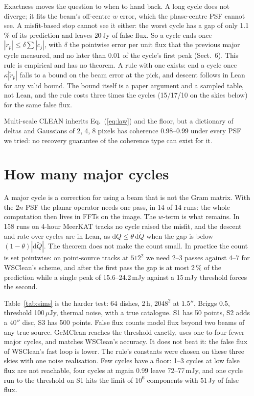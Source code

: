 \documentclass[twocolumn,10pt]{article}
\theoremstyle{remark}
\begin{document}
Exactness moves the question to when to hand back. A long cycle does not diverge; it fits the beam's off-centre $w$ error, which the phase-centre PSF cannot see. A misfit-based stop cannot see it either: the worst cycle has a gap of only 1.1\,\% of its prediction and leaves 20\,Jy of false flux. So a cycle ends once $|r_p|\le\delta\sum|c_j|$, with $\delta$ the pointwise error per unit flux that the previous major cycle measured, and no later than $0.01$ of the cycle's first peak (Sect.~6). This rule is empirical and has no theorem. A rule with one exists: end a cycle once $\kappa|\tilde r_p|$ falls to a bound on the beam error at the pick, and descent follows in Lean for any valid bound. The bound itself is a paper argument and a sampled table, not Lean, and the rule costs three times the cycles (15/17/10 on the skies below) for the same false flux.

Multi-scale CLEAN inherits Eq.~(\ref{eq:law}) and the floor, but a dictionary of deltas and Gaussians of 2, 4, 8 pixels has coherence 0.98--0.99 under every PSF we tried: no recovery guarantee of the coherence type can exist for it.

\section{How many major cycles}

A major cycle is a correction for using a beam that is not the Gram matrix. With the $2n$ PSF the planar operator needs one pass, in 14 of 14 runs; the whole computation then lives in FFTs on the image. The $w$-term is what remains. In 158 runs on 4-hour MeerKAT tracks no cycle raised the misfit, and the descent and rate over cycles are in Lean, as $\mathrm{d}Q\le\theta\,\mathrm{d}\tilde Q$ when the gap is below $(1-\theta)|\mathrm{d}\tilde Q|$. The theorem does not make the count small. In practice the count is set pointwise: on point-source tracks at $512^2$ we need 2--3 passes against 4--7 for WSClean's scheme, and after the first pass the gap is at most 2\,\% of the prediction while a single peak of 15.6--24.2\,mJy against a 15\,mJy threshold forces the second.

Table~\ref{tab:sims} is the harder test: 64 dishes, 2\,h, $2048^2$ at $1.5''$, Briggs 0.5, threshold 100\,$\mu$Jy, thermal noise, with a true catalogue. S1 has 50 points, S2 adds a $40''$ disc, S3 has 500 points. False flux counts model flux beyond two beams of any true source. GeMClean reaches the threshold exactly, uses one to four fewer major cycles, and matches WSClean's accuracy. It does not beat it: the false flux of WSClean's fast loop is lower. The rule's constants were chosen on these three skies with one noise realisation. Few cycles have a floor: 1--3 cycles at low false flux are not reachable, four cycles at mgain 0.99 leave 72--77\,mJy, and one cycle run to the threshold on S1 hits the limit of $10^6$ components with 51\,Jy of false flux.
\end{document}
